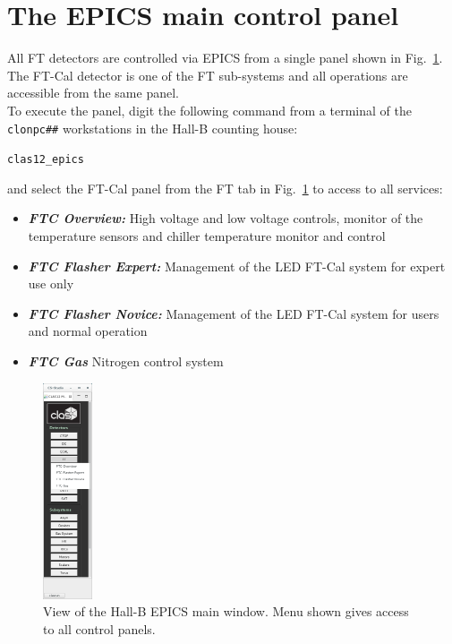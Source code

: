 \documentclass[11.5pt]{article}
\begin{document}
\section{The EPICS main control panel}  
All FT detectors are controlled via EPICS from a single panel shown in Fig.~\ref{fig:EPICSmain}. The FT-Cal detector is one of the FT sub-systems and all operations are accessible from the same panel.\\
To execute the panel, digit the following command from a terminal of the \texttt{clonpc\#\#} workstations in the Hall-B counting house:
\begin{center}
\texttt{clas12\_epics}
\end{center}
and select the FT-Cal panel from the FT tab in Fig.~\ref{fig:EPICSmain} to access to all services:
\begin{itemize}
\item \textbf{\textit{FTC Overview:}} High voltage and low voltage controls, monitor of the temperature sensors and chiller temperature monitor and control
\item \textbf{\textit{FTC Flasher Expert:}} Management of the LED FT-Cal system for expert use only
\item \textbf{\textit{FTC Flasher Novice:}} Management of the LED FT-Cal system for users and normal operation
\item \textbf{\textit{FTC Gas}} Nitrogen control system
\end{itemize}    
\begin{figure}[ht!]
\center
\includegraphics[width=0.13\textwidth]{pics/clascss_main_menu_FT_selection.png}
\caption{ \label{fig:EPICSmain} View of the Hall-B EPICS main window. Menu shown gives access to all control panels.}
\end{figure}
\end{document}
